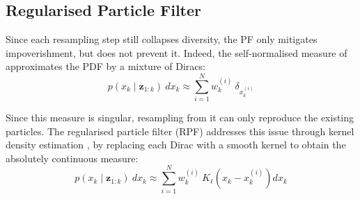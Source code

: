 \begin{algorithm}[!htb]
	\begin{algorithmic}
	\EndIf
	\end{algorithmic}\caption{Generic Particle Filter}\label{alg:PF}
\end{algorithm}

\subsection{Regularised Particle Filter}

Since each resampling step still collapses diversity, the PF only mitigates impoverishment, but does not prevent it. Indeed, the self-normalised measure of  approximates the PDF by a mixture of Diracs:
\begin{equation}
	p(x_k\mid\mathbf{z}_{1:k})\:dx_k\approx\sum_{i=1}^Nw_k^{(i)}\:\delta_{x_k^{(i)}}\label{eq:RPF_dirac}
\end{equation}

Since this measure is singular, resampling from it can only reproduce the existing particles. The regularised particle filter (RPF) \cite{bib:RPF} addresses this issue through kernel density estimation \cite{bib:Rosenblatt,bib:Parzen,bib:KDE-multivariate}, by replacing each Dirac with a smooth kernel to obtain the absolutely continuous measure:
\begin{equation}
	p(x_k\mid\mathbf{z}_{1:k})\:dx_k\approx\sum_{i=1}^Nw_k^{(i)}\:K_\ell\left(x_k-x_k^{(i)}\right)dx_k\label{eq:RPF_kernel}
\end{equation}

